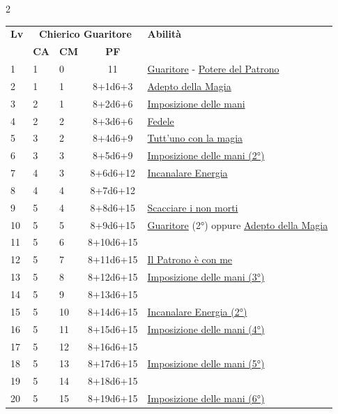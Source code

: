 {\begin{multicols}{2}

\noindent\begin{tabularx}{\linewidth}{p{0.55cm}|p{0.55cm}p{0.55cm}c|X|}
	\toprule
 \rowcolor{gray!20}	\textbf{Lv} & \multicolumn{3}{c|}{\textbf{Chierico Guaritore}} & \textbf{Abilità} \\
& \centering\arraybackslash \textbf{CA} & \centering\arraybackslash \textbf{CM} & \centering\arraybackslash \textbf{PF} & \\
	\toprule
	1 & 1 & 0 & 11 & \hyperlink{Guaritore}{Guaritore} - \hyperlink{Potere del Patrono}{Potere del Patrono}\\
	\rowcolor{gray!20}2 & 1 & 1 & 8+1d6+3 & \hyperlink{Adepto della Magia}{Adepto della Magia}\\
	3 & 2 & 1 & 8+2d6+6 & \hyperlink{Imposizione delle mani}{Imposizione delle mani}\\
	\rowcolor{gray!20}4 & 2 & 2 & 8+3d6+6 & \hyperlink{Fedele}{Fedele}\\
	5 & 3 & 2 & 8+4d6+9 & \hyperlink{Tutt'uno con la magia}{Tutt'uno con la magia}\\
	\rowcolor{gray!20}6 & 3 & 3 & 8+5d6+9 & \hyperlink{Imposizione delle mani}{Imposizione delle mani (2°)}\\
	7 & 4 & 3 & 8+6d6+12 & \hyperlink{Incanalare Energia}{Incanalare Energia}\\
	\rowcolor{gray!20}8 & 4 & 4 & 8+7d6+12 & \\
	9 & 5 & 4 & 8+8d6+15 & \hyperlink{Scacciare i non morti}{Scacciare i non morti}\\
	\rowcolor{gray!20}10 & 5 & 5 & 8+9d6+15 & \hyperlink{Guaritore}{Guaritore} (2°) oppure \hyperlink{Adepto della Magia}{Adepto della Magia}\\
	11 & 5 & 6 & 8+10d6+15 & \\
	\rowcolor{gray!20}12 & 5 & 7 & 8+11d6+15 & \hyperlink{Il Patrono è con me}{Il Patrono è con me}\\
	13 & 5 & 8 & 8+12d6+15 & \hyperlink{Imposizione delle mani}{Imposizione delle mani (3°)}\\
	\rowcolor{gray!20}14 & 5 & 9 & 8+13d6+15 & \\
	15 & 5 & 10 & 8+14d6+15 & \hyperlink{Incanalare Energia}{Incanalare Energia (2°)}\\
	\rowcolor{gray!20}16 & 5 & 11 & 8+15d6+15 & \hyperlink{Imposizione delle mani}{Imposizione delle mani (4°)}\\
	17 & 5 & 12 & 8+16d6+15 & \\
	\rowcolor{gray!20}18 & 5 & 13 & 8+17d6+15 & \hyperlink{Imposizione delle mani}{Imposizione delle mani (5°)}\\
	19 & 5 & 14 & 8+18d6+15 & \\
	\rowcolor{gray!20}20 & 5 & 15 & 8+19d6+15 & \hyperlink{Imposizione delle mani}{Imposizione delle mani (6°)}\\
\end{tabularx}


\end{multicols}}
